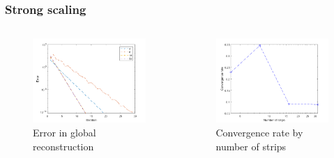 \documentclass{beamer}
\begin{document}
\begin{frame}
\frametitle{Strong scaling}

\begin{columns}
	\begin{column}{0.5\textwidth}
		\begin{figure}
			\includegraphics[width=\textwidth]{FIG/MTLB_strips_strong_error.png}
			\caption{Error in global reconstruction}
		\end{figure}
	\end{column}
	\begin{column}{0.5\textwidth}
		\begin{figure}
			\includegraphics[width=\textwidth]{FIG/MTLB_strips_strong_conv.png}
			\caption{Convergence rate by number of strips}
		\end{figure}
	\end{column}
\end{columns}

\end{frame}
\end{document}
